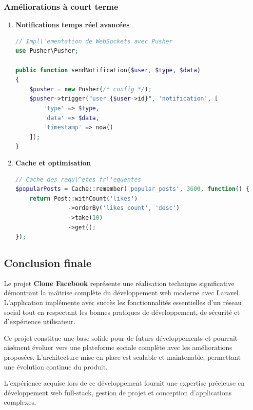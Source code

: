 \documentclass[12pt,a4paper]{article}
\begin{document}
\subsubsection{Am\'eliorations \`a court terme}

\begin{enumerate}
    \item \textbf{Notifications temps r\'eel avanc\'ees}
    \begin{lstlisting}[language=PHP]
// Impl\'ementation de WebSockets avec Pusher
use Pusher\Pusher;

public function sendNotification($user, $type, $data)
{
    $pusher = new Pusher(/* config */);
    $pusher->trigger("user.{$user->id}", 'notification', [
        'type' => $type,
        'data' => $data,
        'timestamp' => now()
    ]);
}
    \end{lstlisting}

    \item \textbf{Cache et optimisation}
    \begin{lstlisting}[language=PHP]
// Cache des requ\^etes fr\'equentes
$popularPosts = Cache::remember('popular_posts', 3600, function() {
    return Post::withCount('likes')
               ->orderBy('likes_count', 'desc')
               ->take(10)
               ->get();
});
    \end{lstlisting}
\end{enumerate}

\subsection{Conclusion finale}

Le projet \textbf{Clone Facebook} repr\'esente une r\'ealisation technique significative d\'emontrant la ma\^{\i}trise compl\`ete du d\'eveloppement web moderne avec Laravel. L'application impl\'emente avec succ\`es les fonctionnalit\'es essentielles d'un r\'eseau social tout en respectant les bonnes pratiques de d\'eveloppement, de s\'ecurit\'e et d'exp\'erience utilisateur.

Ce projet constitue une base solide pour de futurs d\'eveloppements et pourrait ais\'ement \'evoluer vers une plateforme sociale compl\`ete avec les am\'eliorations propos\'ees. L'architecture mise en place est scalable et maintenable, permettant une \'evolution continue du produit.

L'exp\'erience acquise lors de ce d\'eveloppement fournit une expertise pr\'ecieuse en d\'eveloppement web full-stack, gestion de projet et conception d'applications complexes.
\end{document}

